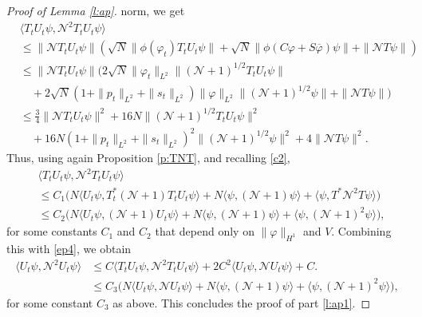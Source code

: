 \documentclass[11pt,a4paper]{scrartcl}
\newcommand{\N}{\mathcal{N}}
\begin{document}
\begin{proof}[Proof of Lemma \ref{l:ap}]
  norm, we get
  \begin{align*}
    & \langle T_t U_t \psi, \N^2 T_t U_t \psi \rangle \\
    & \le \| \N T_t U_t \psi \| ( \sqrt{N} \| \phi(\varphi_t) T_t U_t \psi \|
    + \sqrt{N} \| \phi(C \varphi + S \overline{\varphi}) \psi \| + \| \N T
    \psi \| ) \\
    & \le \| \N T_t U_t \psi \| ( 2 \sqrt{N} \| \varphi_t \|_{L^2} \|
    (\N+1)^{1/2} T_t U_t \psi \| \\
    & \quad + 2 \sqrt{N} ( 1 + \| p_t \|_{L^2} + \| s_t \|_{L^2}) \| \varphi
    \|_{L^2} \| (\N+1)^{1/2} \psi \| + \| \N T \psi \| ) \\
    & \le \frac{3}{4} \| \N T_t U_t \psi \|^2 + 16N \| (\N + 1)^{1/2} T_t U_t
    \psi \|^2 \\
    & \quad + 16N (1 + \| p_t \|_{L^2} + \| s_t \|_{L^2})^2 \| (\N + 1)^{1/2}
    \psi \|^2 + 4\| \N T \psi \|^2.
  \end{align*}
  Thus, using again Proposition \ref{p:TNT}, and recalling \eqref{c2},
  \begin{align*}
    & \langle T_t U_t \psi, \N^2 T_t U_t \psi \rangle \\
    & \le C_1 \big( N \langle U_t \psi, T_t^* (\N+1) T_t U_t \psi \rangle + N
    \langle \psi, (\N+1) \psi \rangle + \langle \psi, T^* \N^2 T \psi \rangle
    \big) \\
    & \le C_2 \big( N \langle U_t \psi, (\N+1) U_t \psi \rangle + N \langle
    \psi, (\N+1) \psi \rangle + \langle \psi, (\N+1)^2 \psi \rangle \big),
  \end{align*}
  for some constants $C_1$ and $C_2$ that depend only on $\| \varphi \|_{H^1}$
  and $V$. Combining this with \eqref{ep4}, we obtain
  \begin{align*}
    \langle U_t \psi, \N^2 U_t \psi \rangle 
    & \le C \langle T_t U_t \psi, \N^2 T_t U_t \psi \rangle + 2 C^2
    \langle U_t \psi, \N U_t \psi \rangle + C. \\
    & \le C_3 \big( N \langle U_t \psi, \N U_t \psi \rangle + N \langle
    \psi, (\N+1) \psi \rangle + \langle \psi, (\N+1)^2 \psi \rangle \big),
  \end{align*}
  for some constant $C_3$ as above. This concludes the proof of part
  \ref{l:ap1}.



\end{proof}
\end{document}
